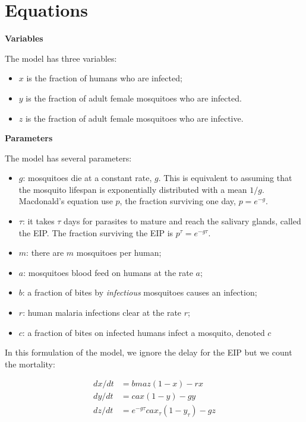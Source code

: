\documentclass[
]{book}
\begin{document}
\section{Equations}\label{equations}

\textbf{Variables}

The model has three variables:

\begin{itemize}
\item
  \(x\) is the fraction of humans who are infected;
\item
  \(y\) is the fraction of adult female mosquitoes who are infected.
\item
  \(z\) is the fraction of adult female mosquitoes who are infective.
\end{itemize}

\textbf{Parameters}

The model has several parameters:

\begin{itemize}
\item
  \(g\): mosquitoes die at a constant rate, \(g\). This is equivalent to assuming that the mosquito lifespan is exponentially distributed with a mean \(1/g\). Macdonald's equation use \(p\), the fraction surviving one day, \(p = e^{-g}\).
\item
  \(\tau\): it takes \(\tau\) days for parasites to mature and reach the salivary glands, called the EIP. The fraction surviving the EIP is \(p^\tau = e^{-g \tau}\).
\item
  \(m\): there are \(m\) mosquitoes per human;
\item
  \(a\): mosquitoes blood feed on humans at the rate \(a\);
\item
  \(b\): a fraction of bites by \emph{infectious} mosquitoes causes an infection;
\item
  \(r\): human malaria infections clear at the rate \(r\);
\item
  \(c\): a fraction of bites on infected humans infect a mosquito, denoted \(c\)
\end{itemize}

In this formulation of the model, we ignore the delay for the EIP but we count the mortality:

\[ 
\begin{array}{rl}
dx/dt &= b m a z (1-x) - r x \\
dy/dt &= c a x (1-y) - g y  \\
dz/dt &= e^{-g \tau} c a x_\tau (1-y_\tau) - g z  \\
\end{array}
\]
\end{document}
